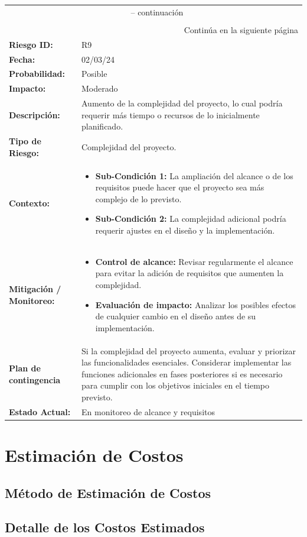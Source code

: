 \begin{longtable}{|m{3cm}|m{10.5cm}|}
	\hline
	\rowcolor{black!75} \multicolumn{2}{|c|}{\color{white}\textbf{Hoja de información de riesgo}} \\ 
	\hline
	\endfirsthead
	\multicolumn{2}{c}{{\tablename\ \thetable{} -- continuación}} \\
	\hline
	\rowcolor{black!75} \multicolumn{2}{|c|}{\color{white}\textbf{Hoja de información de riesgo}} \\ 
	\hline
	\endhead
	\hline \multicolumn{2}{r}{{Continúa en la siguiente página}} \\
	\endfoot
	\hline
	\endlastfoot
	
	\textbf{Riesgo ID:} & R9 \\ \hline
	\textbf{Fecha:} & 02/03/24 \\ \hline
	\textbf{Probabilidad:} & Posible \\ \hline
	\textbf{Impacto:} & Moderado \\ \hline
	\textbf{Descripción:} & Aumento de la complejidad del proyecto, lo cual podría requerir más tiempo o recursos de lo inicialmente planificado. \\ \hline
	\textbf{Tipo de Riesgo:} & Complejidad del proyecto. \\ \hline
	\textbf{Contexto:} & 
	\begin{itemize}
		\item \textbf{Sub-Condición 1:} La ampliación del alcance o de los requisitos puede hacer que el proyecto sea más complejo de lo previsto.
		\item \textbf{Sub-Condición 2:} La complejidad adicional podría requerir ajustes en el diseño y la implementación.
	\end{itemize} \\ \hline
	\textbf{Mitigación / Monitoreo:} &
	\begin{itemize}
		\item \textbf{Control de alcance:} Revisar regularmente el alcance para evitar la adición de requisitos que aumenten la complejidad.
		\item \textbf{Evaluación de impacto:} Analizar los posibles efectos de cualquier cambio en el diseño antes de su implementación.
	\end{itemize} \\ \hline
	\textbf{Plan de contingencia} & Si la complejidad del proyecto aumenta, evaluar y priorizar las funcionalidades esenciales. Considerar implementar las funciones adicionales en fases posteriores si es necesario para cumplir con los objetivos iniciales en el tiempo previsto. \\ \hline
	\textbf{Estado Actual:} & En monitoreo de alcance y requisitos \\ \hline
\end{longtable}
\caption{Hoja de información de riesgo - R9} \label{tabla:R9}
\vspace{0.5cm}

\section{Estimación de Costos}
\subsection{Método de Estimación de Costos}
\subsection{Detalle de los Costos Estimados}

